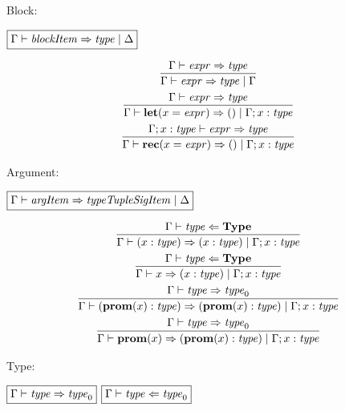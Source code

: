 Block:

$\fbox{$\Gamma \vdash \mathit{blockItem} \Rightarrow \mathit{type} \mid \Delta$}$

\begin{gather*}
  \infer{\Gamma \vdash \mathit{expr} \Rightarrow \mathit{type} \mid \Gamma}{
    \Gamma \vdash \mathit{expr} \Rightarrow \mathit{type}
  }
  \\
  \infer{\Gamma \vdash \mathbf{let}(x = \mathit{expr}) \Rightarrow () \mid \Gamma; x: \mathit{type}}{
    \Gamma \vdash \mathit{expr} \Rightarrow \mathit{type}
  }
  \\
  \infer{\Gamma \vdash \mathbf{rec}(x = \mathit{expr}) \Rightarrow () \mid \Gamma; x: \mathit{type}}{
    \Gamma; x: \mathit{type} \vdash \mathit{expr} \Rightarrow \mathit{type}
  }
\end{gather*}

Argument:

$\fbox{$\Gamma \vdash \mathit{argItem} \Rightarrow \mathit{typeTupleSigItem} \mid \Delta$}$

\begin{gather*}
  \infer{\Gamma \vdash (x: \mathit{type}) \Rightarrow (x: \mathit{type}) \mid \Gamma; x: \mathit{type}}{
    \Gamma \vdash \mathit{type} \Leftarrow \mathbf{Type}
  }
  \\
  \infer{\Gamma \vdash x \Rightarrow (x: \mathit{type}) \mid \Gamma; x: \mathit{type}}{
    \Gamma \vdash \mathit{type} \Leftarrow \mathbf{Type}
  }
  \\
  \infer{\Gamma \vdash (\mathbf{prom}(x): \mathit{type}) \Rightarrow (\mathbf{prom}(x): \mathit{type}) \mid \Gamma; x: \mathit{type}}{
    \Gamma \vdash \mathit{type} \Rightarrow \mathit{type}_0
  }
  \\
  \infer{\Gamma \vdash \mathbf{prom}(x) \Rightarrow (\mathbf{prom}(x): \mathit{type}) \mid \Gamma; x: \mathit{type}}{
    \Gamma \vdash \mathit{type} \Rightarrow \mathit{type}_0
  }
\end{gather*}

Type:

$\fbox{$\Gamma \vdash \mathit{type} \Rightarrow \mathit{type}_0$}$
$\fbox{$\Gamma \vdash \mathit{type} \Leftarrow \mathit{type}_0$}$

